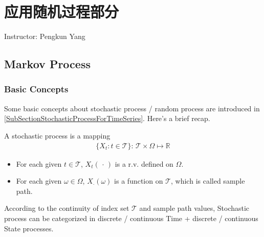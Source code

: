 \section{应用随机过程部分}
\begin{center}
    Instructor: Pengkun Yang 
\end{center}




\subsection{Markov Process}

\subsubsection{Basic Concepts}
Some basic concepts about stochastic process / random process are introduced in \autoref{SubSectionStochasticProcessForTimeSeries}. Here's a brief recap.

A stochastic process is a mapping
\begin{align}
     \{X_t:t\in\mathcal{T}\}:\, \mathcal{T}\times\Omega \mapsto \mathbb{R}
\end{align}

\begin{itemize}[topsep=2pt,itemsep=0pt]
    \item For each given $ t \in\mathcal{T}$, $ X_t(\, \cdot \, ) $ is a r.v. defined on $ \Omega  $.
    \item For each given $ \omega \in \Omega  $, $ X_\cdot (\omega ) $ is a function on $ \mathcal{T} $, which is called sample path.
\end{itemize}

According to the continuity of index set $ \mathcal{T} $ and sample path values, Stochastic process can be categorized in discrete / continuous Time + discrete / continuous State processes.

